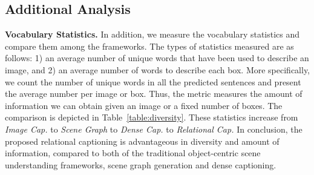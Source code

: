 \documentclass[10pt,twocolumn,letterpaper]{article}
\begin{document}
\begin{table}[t]
\centering
    	\vspace{0mm}
	\caption{Diversity comparison between image captioning, scene graph generation, dense captioning, and relational captioning.
    We measure the number of different words per image (words/img) and the number of words per bounding box (words/box).\vspace{-4mm}}
	\label{table:diversity}	
\end{table}

\subsection{Additional Analysis}



\noindent\textbf{Vocabulary Statistics.}
In addition, we measure the vocabulary statistics and compare them among the frameworks.
The types of statistics measured are as follows:
1) an average number of unique words that have been used to describe an image, and
2) an average number of words to describe each box.
More specifically, we count the number of unique words in all the predicted sentences and present the average number per image or box.
Thus, the metric measures the amount of information we can obtain given an image or a fixed number of boxes.
The comparison is depicted in Table~\ref{table:diversity}.
These statistics increase from \emph{Image Cap.} to \emph{Scene Graph} to \emph{Dense Cap.} to \emph{Relational Cap.}
{In conclusion, the proposed relational captioning is advantageous in diversity and amount of information, compared to both of the traditional object-centric scene understanding frameworks, scene graph generation and dense captioning.}
\end{document}
